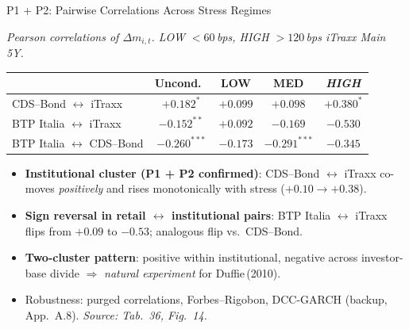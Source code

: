 \documentclass[aspectratio=169,11pt]{beamer}
\newcommand{\hlt}[1]{\textcolor{edhecred}{\textbf{#1}}}     %
\newcommand{\hltb}[1]{\textcolor{accentblue}{\textbf{#1}}}  %
\begin{document}
\begin{frame}[t]{P1 + P2: Pairwise Correlations Across Stress Regimes}
\centering
\scriptsize
\vspace{0.05cm}

\textit{Pearson correlations of $\Delta m_{i,t}$. LOW $<60$\,bps, HIGH $>120$\,bps iTraxx Main 5Y.}

\vspace{0.25cm}
\renewcommand{\arraystretch}{1.30}
\setlength{\tabcolsep}{8pt}

\begin{tabular}{lcccc}
\toprule
                                  & Uncond.\ & LOW    & MED    & \textit{HIGH} \\
\midrule
\rowcolor{mygreen!15}
CDS--Bond $\leftrightarrow$ iTraxx & $+0.182^{*}$  & $+0.099$ & $+0.098$ & \hlt{$+0.380^{*}$} \\
\midrule
\rowcolor{myred!15}
BTP Italia $\leftrightarrow$ iTraxx & $-0.152^{**}$ & $+0.092$ & $-0.169$ & \hlt{$-0.530$} \\
\rowcolor{myred!15}
BTP Italia $\leftrightarrow$ CDS--Bond & $-0.260^{***}$ & $-0.173$ & $-0.291^{***}$ & \hlt{$-0.345$} \\
\bottomrule
\end{tabular}

\vspace{0.45cm}

\begin{itemize}\itemsep=0.06cm\footnotesize
  \item \textcolor{mygreen}{\textbf{Institutional cluster (P1 + P2 confirmed)}}: CDS--Bond $\leftrightarrow$ iTraxx
        co-moves \emph{positively} and rises monotonically with stress (\hlt{$+0.10 \to +0.38$}).
  \item \textcolor{myred}{\textbf{Sign reversal in retail $\leftrightarrow$ institutional pairs}}:
        BTP Italia $\leftrightarrow$ iTraxx flips from $+0.09$ to \hlt{$-0.53$}; analogous flip vs.\ CDS--Bond.
  \item \hltb{Two-cluster pattern}: positive within institutional, negative across investor-base divide
        $\Rightarrow$ \emph{natural experiment} for Duffie\,(2010).
  \item Robustness: purged correlations, Forbes--Rigobon, DCC-GARCH (backup, App.\ A.8). \textit{Source: Tab.\ 36, Fig.\ 14.}
\end{itemize}

\end{frame}
\end{document}
